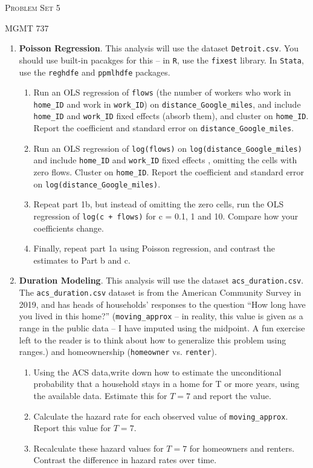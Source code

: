 \documentclass[11pt, a4paper]{article}
\begin{document}
\begin{center}
  {\Large \textsc{Problem Set 5}}

  MGMT 737
\end{center}

\begin{enumerate}
\item \textbf{Poisson Regression}. This analysis will use the dataset
  \texttt{Detroit.csv}. You should use built-in pacakges for this --
  in \texttt{R}, use the \texttt{fixest} library. In \texttt{Stata},
  use the \texttt{reghdfe} and \texttt{ppmlhdfe} packages.
  \begin{enumerate}
  \item Run an OLS regression of \texttt{flows} (the number of workers
    who work in \texttt{home\_ID} and work in \texttt{work\_ID}) on
    \texttt{distance\_Google\_miles}, and include \texttt{home\_ID} and
    \texttt{work\_ID} fixed effects (absorb them), and cluster on
    \texttt{home\_ID}. Report the coefficient and standard error on
    \texttt{distance\_Google\_miles}.
  \item Run an OLS regression of \texttt{log(flows)} on
    \texttt{log(distance\_Google\_miles)} and include \texttt{home\_ID}
    and \texttt{work\_ID} fixed effects , omitting the cells with zero
    flows. Cluster on \texttt{home\_ID}. Report the coefficient and
    standard error on \texttt{log(distance\_Google\_miles)}.
  \item Repeat part 1b, but instead of omitting the zero cells, run
    the OLS regression of \texttt{log(c + flows)} for c = 0.1, 1 and
    10. Compare how your coefficients change. 
  \item Finally, repeat part 1a using Poisson regression, and contrast
    the estimates to Part b and c.
  \end{enumerate}
\item \textbf{Duration Modeling}. This analysis will use the dataset
  \texttt{acs\_duration.csv}. The
  \texttt{acs\_duration.csv} dataset is from the American Community
  Survey in 2019, and has heads of households' responses to the
  question ``How long have you lived in this home?''
  (\texttt{moving\_approx}  -- in reality, this value is given as
    a range in the public data -- I have imputed using the midpoint. A
    fun exercise left to the reader is to think about how to
    generalize this problem using ranges.) and homeownership
  (\texttt{homeowner} vs. \texttt{renter}).
    \begin{enumerate}
    \item Using the ACS data,write down how to estimate the unconditional probability that a household stays in a home for T or more years, using the available data. Estimate this for $T=7$ and report the value.
    \item Calculate the hazard rate for each observed value of
      \texttt{moving\_approx}. Report this value for $T=7$.
    \item Recalculate these hazard values for $T=7$ for homeowners and
      renters. Contrast the difference in hazard rates over time.
    \end{enumerate}
  \end{enumerate}
\end{document}
